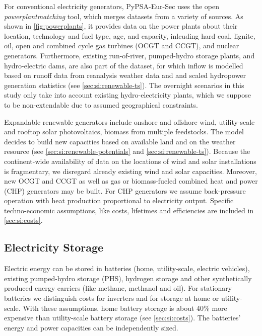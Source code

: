 For conventional electricity generators, PyPSA-Eur-Sec uses the open
\textit{powerplantmatching} tool, which merges datasets from a variety of
sources. As shown in \cref{fig:powerplants},
it provides data on the power plants about their location, technology and fuel
type, age, and capacity, inlcuding hard coal, lignite, oil, open and combined
cycle gas turbines (OCGT and CCGT), and nuclear generators. Furthermore,
existing run-of-river, pumped-hydro storage plants, and hydro-electric dams, are
also part of the dataset, for which inflow is modelled based on runoff data from
reanalysis weather data and and scaled hydropower generation statistics (see
\cref{sec:si:renewable-ts}). The overnight scenarios in this study only take
into account existing hydro-electricity plants, which we suppose to be
non-extendable due to assumed geographical constraints. 

Expandable renewable generators include onshore and offshore wind, utility-scale
and rooftop solar photovoltaics, biomass from multiple feedstocks. The model
decides to build new capacities based on available land and on the weather
resource (see \cref{sec:si:renewable-potentials} and
\cref{sec:si:renewable-ts}). Because the continent-wide availability of data on
the locations of wind and solar installations is fragmentary, we disregard
already existing wind and solar capacities. Moreover, new OCGT and CCGT as well
as gas or biomass-fueled combined heat and power (CHP) generators may be built.
For CHP generators we assume back-pressure operation with heat production
proportional to electricity output. Specific techno-economic assumptions, like
costs, lifetimes and efficiencies are included in \cref{sec:si:costs}.

\subsection{Electricity Storage}
\label{sec:si:electricity:storage}

Electric energy can be stored in batteries (home, utility-scale, electric
vehicles), existing pumped-hydro storage (PHS), hydrogen storage and other
synthetically produced energy carriers (like methane, methanol and oil). For
stationary batteries we distinguish costs for inverters and for storage at home
or utility-scale. With these assumptions, home battery storage is about 40\%
more expensive than utility-scale battery storage (see \cref{sec:si:costs}). The
batteries' energy and power capacities can be independently sized.

